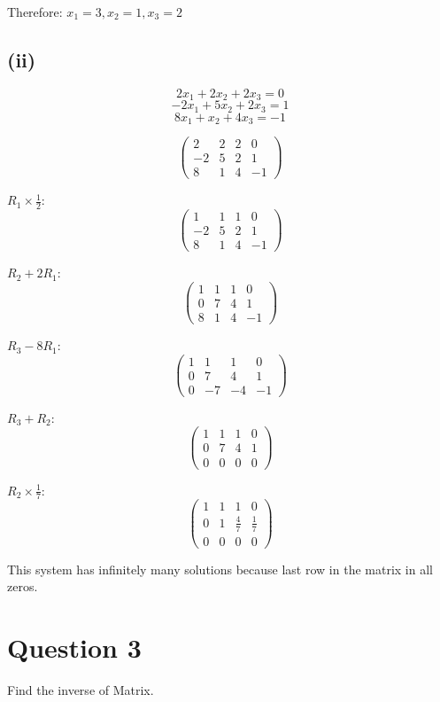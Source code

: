 \documentclass[12pt]{article}
\begin{document}
Therefore: $x_1 = 3, x_2 = 1, x_3 = 2$

\subsection*{(ii)}
\[
	2x_1 + 2x_2 + 2x_3 = 0
\]
\[
	-2x_1 + 5x_2 + 2x_3 = 1
\]
\[
	8x_1 + x_2 + 4x_3 = -1
\]

\[
	\begin{pmatrix}
		2  & 2 & 2 & 0  \\
		-2 & 5 & 2 & 1  \\
		8  & 1 & 4 & -1
	\end{pmatrix}
\]

$R_1 \times \frac{1}{2}$:
\[
	\begin{pmatrix}
		1  & 1 & 1 & 0  \\
		-2 & 5 & 2 & 1  \\
		8  & 1 & 4 & -1
	\end{pmatrix}
\]

$R_2 + 2R_1$:
\[
	\begin{pmatrix}
		1 & 1  & 1  & 0  \\
		0 & 7  & 4  & 1  \\
		8  & 1 & 4 & -1
	\end{pmatrix}
\]

$R_3 - 8R_1$:
\[
	\begin{pmatrix}
		1 & 1  & 1  & 0  \\
		0 & 7  & 4  & 1  \\
		0 & -7 & -4 & -1
	\end{pmatrix}
\]

$R_3 + R_2$:
\[
	\begin{pmatrix}
		1 & 1 & 1 & 0 \\
		0 & 7 & 4 & 1 \\
		0 & 0 & 0 & 0
	\end{pmatrix}
\]

$R_2 \times \frac{1}{7}$:
\[
	\begin{pmatrix}
		1 & 1 & 1           & 0           \\
		0 & 1 & \frac{4}{7} & \frac{1}{7} \\
		0 & 0 & 0           & 0
	\end{pmatrix}
\]

This system has infinitely many solutions because last row in the matrix in all zeros.

\section*{Question 3}
Find the inverse of Matrix.
\end{document}
